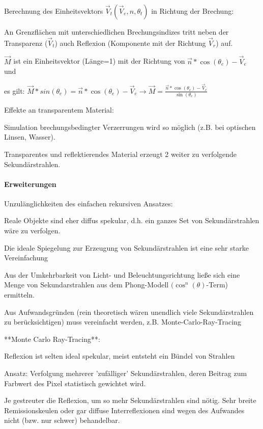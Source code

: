 \documentclass[landscape]{article}
\begin{document}
\begin{multicols}{3}
  Berechnung des Einheitsvektors $\vec{V}_t(\vec{V}_e,n,\theta_t)$ in Richtung der Brechung:
  \begin{itemize*}
    \item An Grenzflächen mit unterschiedlichen Brechungsindizes tritt neben der Transparenz ($\vec{V}_t$) auch Reflexion (Komponente mit der Richtung $\vec{V}_r$) auf.
    \item $\vec{M}$ ist ein Einheitsvektor (Länge=1) mit der Richtung von $\vec{n}*\cos(\theta_e)-\vec{V}_e$ und
    \item es gilt: $\vec{M}*sin(\theta_e)=\vec{n}*\cos(\theta_e)-\vec{V}_e \rightarrow \vec{M}=\frac{\vec{n}*\cos(\theta_e)-\vec{V}_e}{\sin(\theta_e)}$
    \item Effekte an transparentem Material:
    \item Simulation brechungsbedingter Verzerrungen wird so möglich (z.B. bei optischen Linsen, Wasser).
    \item Transparentes und reflektierendes Material erzeugt 2 weiter zu verfolgende Sekundärstrahlen.
  \end{itemize*}
  
  
  
  \paragraph{Erweiterungen}
  Unzulänglichkeiten des einfachen rekursiven Ansatzes:
  \begin{itemize*}
    \item Reale Objekte sind eher diffus spekular, d.h. ein ganzes Set von Sekundärstrahlen wäre zu verfolgen.
    \item Die ideale Spiegelung zur Erzeugung von Sekundärstrahlen ist eine sehr starke Vereinfachung
    \item Aus der Umkehrbarkeit von Licht- und Beleuchtungsrichtung ließe sich eine Menge von Sekundarstrahlen aus dem Phong-Modell $(\cos^n(\theta)$-Term) ermitteln.
    \item Aus Aufwandsgründen (rein theoretisch wären unendlich viele Sekundärstrahlen zu berücksichtigen) muss vereinfacht werden, z.B. Monte-Carlo-Ray-Tracing
  \end{itemize*}
  
  **Monte Carlo Ray-Tracing**:
  \begin{itemize*}
    \item Reflexion ist selten ideal spekular, meist entsteht ein Bündel von Strahlen
    \item Ansatz: Verfolgung mehrerer 'zufälliger' Sekundärstrahlen, deren Beitrag zum Farbwert des Pixel statistisch gewichtet wird.
    \item Je gestreuter die Reflexion, um so mehr Sekundärstrahlen sind nötig. Sehr breite Remissionskeulen oder gar diffuse Interreflexionen sind wegen des Aufwandes nicht (bzw. nur schwer) behandelbar.
  \end{itemize*}
  

\end{multicols}
\end{document}
